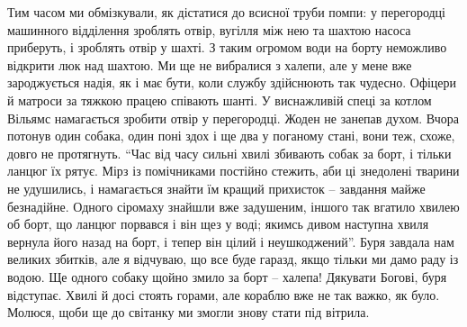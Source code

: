 Тим часом ми обмізкували, як дістатися до всисної труби помпи: у перегородці
машинного відділення зроблять отвір, вугілля між нею та шахтою насоса
приберуть, і зроблять отвір у шахті. З таким огромом води на борту неможливо
відкрити люк над шахтою. Ми ще не вибралися з халепи, але у мене вже
зароджується надія, як і має бути, коли службу здійснюють так чудесно. Офіцери
й матроси за тяжкою працею співають шанті. У виснажливій спеці за котлом
Вільямс намагається зробити отвір у перегородці. Жоден не занепав духом. Вчора
потонув один собака, один поні здох і ще два у поганому стані, вони теж, схоже,
довго не протягнуть. \enquote{Час від часу сильні хвилі збивають собак за борт, і
тільки ланцюг їх рятує. Мірз із помічниками постійно стежить, аби ці знедолені
тварини не удушились, і намагається знайти їм кращий прихисток – завдання майже
безнадійне. Одного сіромаху знайшли вже задушеним, іншого так вгатило хвилею об
борт, що ланцюг порвався і він щез у воді; якимсь дивом наступна хвиля вернула
його назад на борт, і тепер він цілий і неушкоджений}. Буря завдала нам великих
збитків, але я відчуваю, що все буде гаразд, якщо тільки ми дамо раду із водою.
Ще одного собаку щойно змило за борт – халепа! Дякувати Богові, буря відступає.
Хвилі й досі стоять горами, але кораблю вже не так важко, як було. Молюся, щоби
ще до світанку ми змогли знову стати під вітрила.

